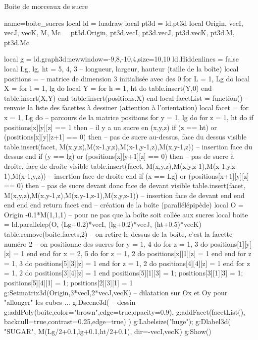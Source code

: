 \begin{demo}{Boite de morceaux de sucre}
\begin{luadraw}{name=boite_sucres}
local ld = luadraw
local pt3d = ld.pt3d
local Origin, vecI, vecJ, vecK, M, Mc = pt3d.Origin, pt3d.vecI, pt3d.vecJ, pt3d.vecK, pt3d.M, pt3d.Mc

local g = ld.graph3d:new{window={-9,8,-10,4},size={10,10}}
ld.Hiddenlines = false
local Lg, lg, ht = 5, 4, 3 -- longueur, largeur, hauteur (taille de la boîte)
local positions = {} -- matrice de dimension 3 initialisée avec des 0
for L = 1, Lg do
    local X = {}
    for l = 1, lg do
        local Y = {}
        for h = 1, ht do table.insert(Y,0) end
        table.insert(X,Y)
    end
    table.insert(positions,X)
end
local facetList = function() -- renvoie la liste des facettes à dessiner (attention à l'orientation)
    local facet = {}
    for x = 1, Lg do -- parcours de la matrice positions
        for y = 1, lg do
            for z = 1, ht do
                if positions[x][y][z] == 1 then -- il y a un sucre en (x,y,z)
                    if (z == ht) or (positions[x][y][z+1] == 0) then -- pas de sucre au-dessus, face du dessus visible
                        table.insert(facet, {M(x,y,z),M(x-1,y,z),M(x-1,y-1,z),M(x,y-1,z)}) -- insertion face du dessus
                    end
                    if (y == lg) or (positions[x][y+1][z] == 0) then -- pas de sucre à droite, face de droite visible
                        table.insert(facet, {M(x,y,z),M(x,y,z-1),M(x-1,y,z-1),M(x-1,y,z)}) -- insertion face de droite
                    end
                    if (x == Lg) or (positions[x+1][y][z] == 0) then -- pas de sucre devant donc face de devant visible
                        table.insert(facet, {M(x,y,z),M(x,y-1,z),M(x,y-1,z-1),M(x,y,z-1)}) -- insertion face de devant
                    end
                end
            end
        end
    end
    return facet
end
-- création de la boîte (parallélépipède)
local O = Origin -0.1*M(1,1,1) -- pour ne pas que la boîte soit collée aux sucres
local boite = ld.parallelep(O, (Lg+0.2)*vecI, (lg+0.2)*vecJ, (ht+0.5)*vecK)
table.remove(boite.facets,2) -- on retire le dessus de la boîte, c'est la facette numéro 2
-- on positionne des sucres
for y = 1, 4 do for z = 1, 3 do  positions[1][y][z] = 1 end end
for x = 2, 5 do for z = 1, 2 do positions[x][1][z] = 1 end end
for z = 1, 3 do positions[5][3][z] = 1 end
for z = 1, 2 do positions[4][4][z] = 1 end
for z = 1, 2 do positions[3][4][z] = 1 end
positions[5][1][3] = 1; positions[3][1][3] = 1; positions[5][4][1] = 1; positions[2][3][1] = 1
g:Setmatrix3d({Origin,3*vecI,2*vecJ,vecK}) -- dilatation sur Ox et Oy pour "allonger" les cubes ...
g:Dscene3d( -- dessin
    g:addPoly(boite,{color="brown",edge=true,opacity=0.9}),
    g:addFacet(facetList(), {backcull=true,contrast=0.25,edge=true})    )
g:Labelsize("huge"); g:Dlabel3d( "SUGAR", M(Lg/2+0.1,lg+0.1,ht/2+0.1), {dir={-vecI,vecK}})
g:Show()
\end{luadraw}
\end{demo}

